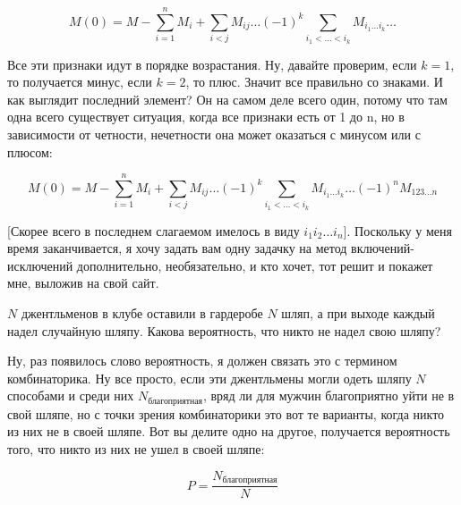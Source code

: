 \documentclass[russian]{lecture-notes}
\theoremstyle{definition}
\begin{document}
\begin{enumerate}
		\[
			M(0) = M - \sum_{i=1}^{n}M_i + \sum_{i<j}M_{ij} \ldots (-1)^k \sum_{i_1<\ldots<i_k}M_{i_1 \ldots i_k} \ldots
		\]
		
		Все эти признаки идут в порядке возрастания. Ну, давайте проверим, если $k = 1$, то получается минус, если $k = 2$, то плюс. Значит все правильно со знаками. И как выглядит последний элемент? Он на самом деле всего один, потому что там одна всего существует ситуация, когда все признаки есть от 1 до n, но в зависимости от четности, нечетности она может оказаться с минусом или с плюсом:
		
		\[
			M(0) = M - \sum_{i=1}^{n}M_i + \sum_{i<j}M_{ij} \ldots (-1)^k \sum_{i_1<\ldots<i_k}M_{i_1 \ldots i_k} \ldots (-1)^n M_{123 \ldots n}
		\]
		
		[Скорее всего в последнем слагаемом имелось в виду $i_1 i_2 \ldots i_n$]. Поскольку у меня время заканчивается, я хочу задать вам одну задачку на метод включений-исключений	дополнительно, необязательно, и кто хочет, тот решит и покажет мне, выложив на свой сайт.
		
		
		\begin{problem}
			$N$ джентльменов в клубе оставили в гардеробе $N$ шляп, а при выходе каждый надел случайную шляпу. Какова вероятность, что никто не надел свою шляпу?
		\end{problem}
	
		Ну, раз появилось слово вероятность, я должен связать это с термином комбинаторика. Ну все просто, если эти джентльмены могли одеть шляпу $N$ способами и среди них $N_{\text{благоприятная}}$, вряд ли для мужчин благоприятно уйти не в свой шляпе, но с точки зрения комбинаторики это вот те варианты, когда никто из них не в своей шляпе. Вот вы делите одно на другое, получается вероятность того, что никто из них не ушел в своей шляпе:
		
		\[
			P = \frac{N_{\text{благоприятная}}}{N}
		\]
		
	\end{enumerate}
	
\end{document}
